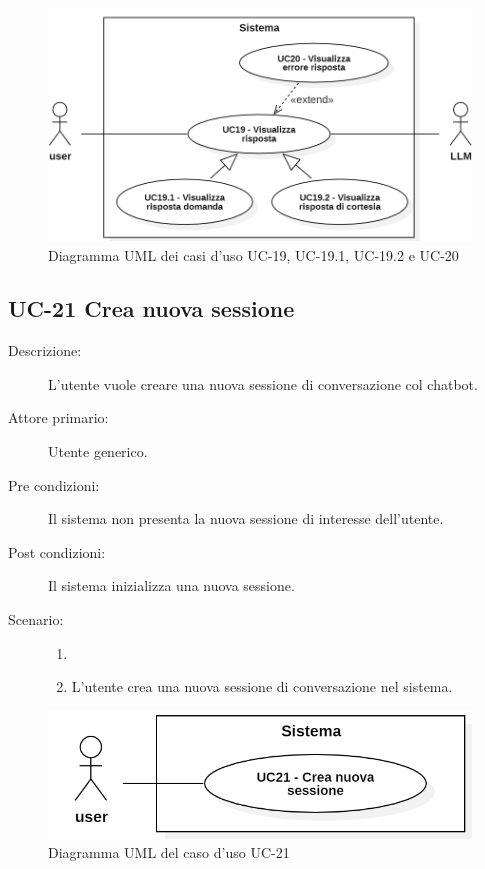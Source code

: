 \begin{figure}[H]
    \centering
    \includegraphics[width=0.8\linewidth]{UC19.PNG} 
    \caption{Diagramma UML dei casi d'uso UC-19, UC-19.1, UC-19.2 e UC-20}
\end{figure}

\subsection{UC-21 Crea nuova sessione}
\begin{description}
    \item[Descrizione:] L'utente vuole creare una nuova sessione di conversazione col chatbot.
    \item[Attore primario:] Utente generico.
    \item[Pre condizioni:] Il sistema non presenta la nuova sessione di interesse dell'utente.
    \item[Post condizioni:] Il sistema inizializza una nuova sessione.
    \item[Scenario:] 
    \begin{enumerate}
        \item[]
        \item L'utente crea una nuova sessione di conversazione nel sistema.
    \end{enumerate}
\end{description}

\begin{figure}[H]
    \centering
    \includegraphics[width=0.8\linewidth]{UC21.PNG} 
    \caption{Diagramma UML del caso d'uso UC-21}
\end{figure}

